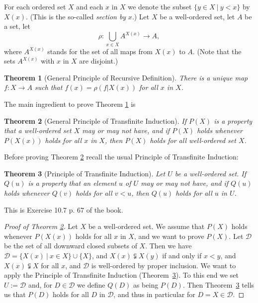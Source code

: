 \documentclass[12pt,letterpaper]{article}
\newtheorem{thm}{Theorem}%
\newcommand{\mc}{\mathcal}
\begin{document}
For each ordered set $X$ and each $x$ in $X$ we denote the subset $\{y\in X\ |\ y<x\}$ by $X(x)$. (This is the so-called \emph{section by} $x$.) Let $X$ be a well-ordered set, let $A$ be a set, let 
$$
\rho:\bigcup_{x\in X}A^{X(x)}\to A,
$$ 
where $A^{X(x)}$ stands for the set of all maps from $X(x)$ to $A$. (Note that the sets $A^{X(x)}$ with $x$ in $X$ are disjoint.) 

\begin{thm}[General Principle of Recursive Definition]\label{TGPRD2}
There is a unique map $f:X\to A$ such that $f(x)=\rho(f|X(x))$ for all $x$ in $X$. 
\end{thm} 

The main ingredient to prove Theorem \ref{TGPRD2} is 

\begin{thm}[General Principle of Transfinite Induction]\label{TGPTI}
If $P(X)$ is a property that a well-ordered set $X$ may or may not have, and if $P(X)$ holds whenever $P(X(x))$ holds for all $x$ in $X$, then $P(X)$ holds for all well-ordered set $X$. 
\end{thm} 

Before proving Theorem \ref{TGPTI} recall the usual Principle of Transfinite Induction: 

\begin{thm}[Principle of Transfinite Induction]\label{TPTI2} 
Let $U$ be a well-ordered set. If $Q(u)$ is a property that an element $u$ of $U$ may or may not have, and if $Q(u)$ holds whenever $Q(v)$ holds for all $v<u$, then $Q(u)$ holds for all $u$ in $U$. 
\end{thm} 

This is Exercise 10.7 p. 67 of the book. 

\begin{proof}[Proof of Theorem \ref{TGPTI}] 
Let $X$ be a well-ordered set. We assume that $P(X)$ holds whenever $P(X(x))$ holds for all $x$ in $X$, and we want to prove $P(X)$. Let $\mc D$ be the set of all downward closed subsets of $X$. Then we have $\mc D=\{X(x)\ |\ x\in X\}\cup\{X\}$, and $X(x)\subsetneqq X(y)$ if and only if $x<y$, and $X(x)\subsetneqq X$ for all $x$, and $\mc D$ is well-ordered by proper inclusion. We want to apply the Principle of Transfinite Induction (Theorem~\ref{TPTI2}). To this end we set $U:=\mc D$ and, for $D\in\mc D$ we define $Q(D)$ as being $P(D)$. Then Theorem~\ref{TPTI2} tells us that $P(D)$ holds for all $D$ in $\mc D$, and thus in particular for $D=X\in\mc D$. 
\end{proof} 
\end{document}
